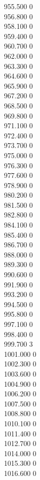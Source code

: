 { 955.500	0 \\
 956.800	0 \\
 958.100	0 \\
 959.400	0 \\
 960.700	0 \\
 962.000	0 \\
 963.300	0 \\
 964.600	0 \\
 965.900	0 \\
 967.200	0 \\
 968.500	0 \\
 969.800	0 \\
 971.100	0 \\
 972.400	0 \\
 973.700	0 \\
 975.000	0 \\
 976.300	0 \\
 977.600	0 \\
 978.900	0 \\
 980.200	0 \\
 981.500	0 \\
 982.800	0 \\
 984.100	0 \\
 985.400	0 \\
 986.700	0 \\
 988.000	0 \\
 989.300	0 \\
 990.600	0 \\
 991.900	0 \\
 993.200	0 \\
 994.500	0 \\
 995.800	0 \\
 997.100	0 \\
 998.400	0 \\
 999.700	3 \\
 1001.000	0 \\
 1002.300	0 \\
 1003.600	0 \\
 1004.900	0 \\
 1006.200	0 \\
 1007.500	0 \\
 1008.800	0 \\
 1010.100	0 \\
 1011.400	0 \\
 1012.700	0 \\
 1014.000	0 \\
 1015.300	0 \\
 1016.600	0 \\
}
